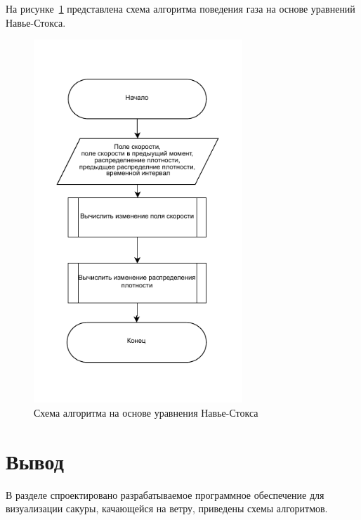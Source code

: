 На рисунке~\ref{fig:Navie-Stocks} представлена схема алгоритма поведения газа на основе уравнений Навье-Стокса. 
\begin{figure}[H]
	\centering
	\includegraphics[width=0.7\textwidth, page=1]{assets/img/Naive_stocks.pdf}   
	\caption{Схема алгоритма на основе уравнения Навье-Стокса}
	\label{fig:Navie-Stocks}
\end{figure}

\section*{Вывод}
В разделе спроектировано разрабатываемое программное обеспечение для визуализации сакуры, качающейся на ветру, приведены схемы алгоритмов.
